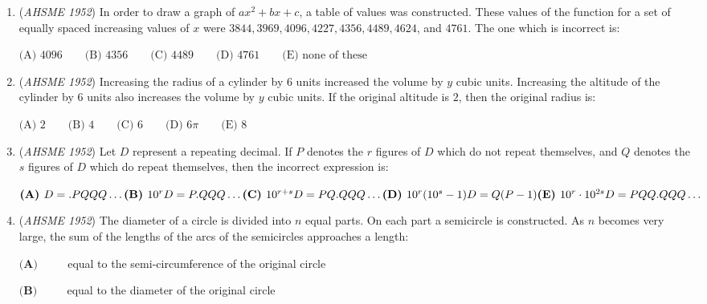 \begin{enumerate}
 $\textbf{(A)}\ \frac {\sqrt {8d^2 - p^2}}{2} \qquad \textbf{(B)}\ \frac {\sqrt {8d^2 + p^2}}{2} \qquad \textbf{(C)}\ \frac{\sqrt{6d^2-p^2}}{2}\qquad\\ \textbf{(D)}\ \frac {\sqrt {6d^2 + p^2}}{2} \qquad \textbf{(E)}\ \frac {8d^2 - p^2}{4}$


	\item (\textit{AHSME 1952}) In order to draw a graph of $ax^2+bx+c$, a table of values was constructed. These values of the function for a set of equally spaced increasing values of $x$ were $3844, 3969, 4096, 4227, 4356, 4489, 4624$, and $4761$. The one which is incorrect is: 


 $\text{(A) } 4096 \qquad \text{(B) } 4356 \qquad \text{(C) } 4489 \qquad \text{(D) } 4761 \qquad \text{(E) } \text{none of these}$


	\item (\textit{AHSME 1952}) Increasing the radius of a cylinder by $6$ units increased the volume by $y$ cubic units. Increasing the altitude of the cylinder by $6$ units also increases the volume by $y$ cubic units. If the original altitude is $2$, then the original radius is: 


 $\text{(A) } 2 \qquad \text{(B) } 4 \qquad \text{(C) } 6 \qquad \text{(D) } 6\pi \qquad \text{(E) } 8$


	\item (\textit{AHSME 1952}) Let $D$ represent a repeating decimal. If $P$ denotes the $r$ figures of $D$ which do not repeat themselves, and $Q$ denotes the $s$ figures of $D$ which do repeat themselves, then the incorrect expression is:


 $\textbf{(A) } D = .PQQQ\ldots \qquad\\ \textbf{(B) } 10^rD = P.QQQ\ldots \\ \textbf{(C) } 10^{r + s}D = PQ.QQQ\ldots \qquad\\ \textbf{(D) } 10^r(10^s - 1)D = Q(P - 1) \\ \textbf{(E) } 10^r\cdot10^{2s}D = PQQ.QQQ\ldots$


	\item (\textit{AHSME 1952}) The diameter of a circle is divided into $n$ equal parts. On each part a semicircle is constructed. As $n$ becomes very large, the sum of the lengths of the arcs of the semicircles approaches a length: 


 $\textbf{(A) } \qquad$ equal to the semi-circumference of the original circle


 $\textbf{(B) } \qquad$ equal to the diameter of the original circle



\end{enumerate}
